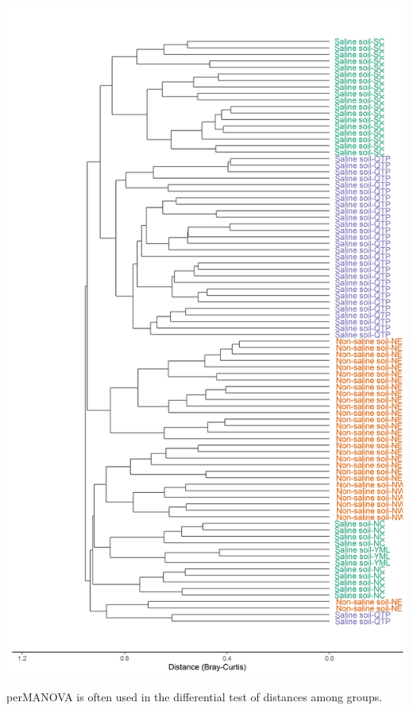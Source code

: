 \documentclass[
]{book}
\newenvironment{Shaded}{\begin{snugshade}}{\end{snugshade}}
\newcommand{\AttributeTok}[1]{\textcolor[rgb]{0.77,0.63,0.00}{#1}}
\newcommand{\CommentTok}[1]{\textcolor[rgb]{0.56,0.35,0.01}{\textit{#1}}}
\newcommand{\ConstantTok}[1]{\textcolor[rgb]{0.00,0.00,0.00}{#1}}
\newcommand{\FunctionTok}[1]{\textcolor[rgb]{0.00,0.00,0.00}{#1}}
\newcommand{\NormalTok}[1]{#1}
\newcommand{\SpecialCharTok}[1]{\textcolor[rgb]{0.00,0.00,0.00}{#1}}
\begin{document}
\begin{center}\includegraphics[width=550px]{Images/plot_clustering} \end{center}

perMANOVA\citep{Anderson_Austral_2001} is often used in the differential test of distances among groups.

\begin{Shaded}
\end{Shaded}
\end{document}

